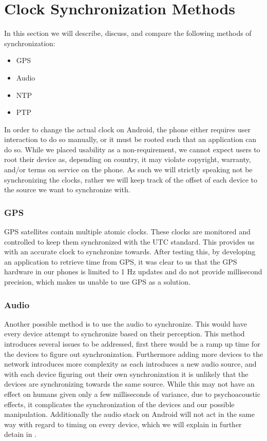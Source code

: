 \section{Clock Synchronization Methods}\label{sec:sync_methods}
In this section we will describe, discuss, and compare the following methods of synchronization:
\begin{multicols}{2}
    \begin{itemize}
        \item GPS
        \item Audio
        \item \ac{NTP}
        \item \ac{PTP}
    \end{itemize}
\end{multicols}
In order to change the actual clock on Android, the phone either requires user interaction to do so manually, or it must be rooted such that an application can do so.
While we placed usability as a non-requirement, we cannot expect users to root their device as, depending on country, it may violate copyright, warranty, and/or terms on service on the phone.
As such we will strictly speaking not be synchronizing the clocks, rather we will keep track of the offset of each device to the source we want to synchronize with.

\subsubsection{GPS}
GPS satellites contain multiple atomic clocks.
These clocks are monitored and controlled to keep them synchronized with the UTC standard.
This provides us with an accurate clock to synchronize towards.\cite{gpsclock}
After testing this, by developing an application to retrieve time from GPS, it was clear to us that the GPS hardware in our phones is limited to 1 Hz updates and do not provide millisecond precision, which makes us unable to use GPS as a solution.

\subsubsection{Audio}
Another possible method is to use the audio to synchronize.
This would have every device attempt to synchronize based on their perception.
This method introduces several issues to be addressed, first there would be a ramp up time for the devices to figure out synchronization.
Furthermore adding more devices to the network introduces more complexity as each introduces a new audio source, and with each device figuring out their own synchronization it is unlikely that the devices are synchronizing towards the same source.
While this may not have an effect on humans given only a few milliseconds of variance, due to psychoacoustic effects, it complicates the synchronization of the devices and our possible manipulation.
Additionally the audio stack on Android will not act in the same way with regard to timing on every device, which we will explain in further detain in .

